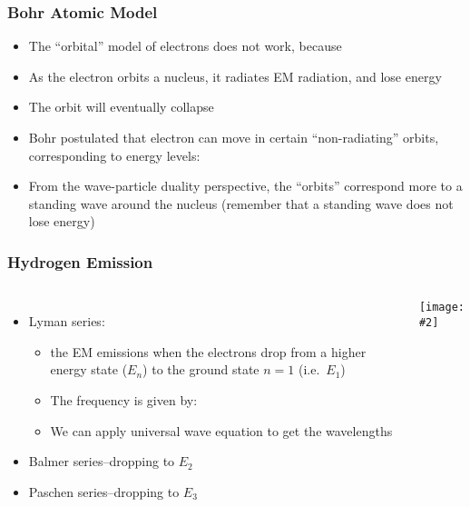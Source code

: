 \documentclass[12pt,compress,aspectratio=169]{beamer}
\newcommand{\pic}[2]{\texttt{[image: \#2]}}
\newcommand{\eq}[2]{\vspace{#1}{\Large\begin{displaymath}#2\end{displaymath}}}
\begin{document}
\begin{frame}
  \frametitle{Bohr Atomic  Model}
  \begin{itemize}
  \item The ``orbital'' model of electrons does not work, because
  \item As the electron orbits a nucleus, it radiates EM radiation, and lose
    energy
  \item The orbit will eventually collapse
  \item Bohr postulated that electron can move in certain ``non-radiating''
    orbits, corresponding to energy levels:

    \eq{-.1in}{
      \boxed{E_n=-\frac{k^2e^4m}{2\hbar^2}\frac{Z^2}{n^2}}
    }

  \item From the wave-particle duality perspective, the ``orbits'' correspond
    more to a standing wave around the nucleus
    (remember that a standing wave does not lose energy)
  \end{itemize}
\end{frame}



\begin{frame}
  \frametitle{Hydrogen Emission}
  \begin{columns}

    \begin{itemize}
    \item Lyman series:
      \begin{itemize}
      \item the EM emissions when the electrons drop from a higher energy state
        ($E_n$) to the ground state $n=1$ (i.e.\ $E_1$)
      \item The frequency is given by:
        
        \eq{-.2in}{
          f=\frac{E_1-E_n}{h}
        }
      \item We can apply universal wave equation to get the wavelengths
      \end{itemize}
    \item Balmer series--dropping to $E_2$
    \item Paschen series--dropping to $E_3$
    \end{itemize}

    \pic{1}{400px-Hydrogen_transitions.png}
  \end{columns}
\end{frame}
\end{document}

